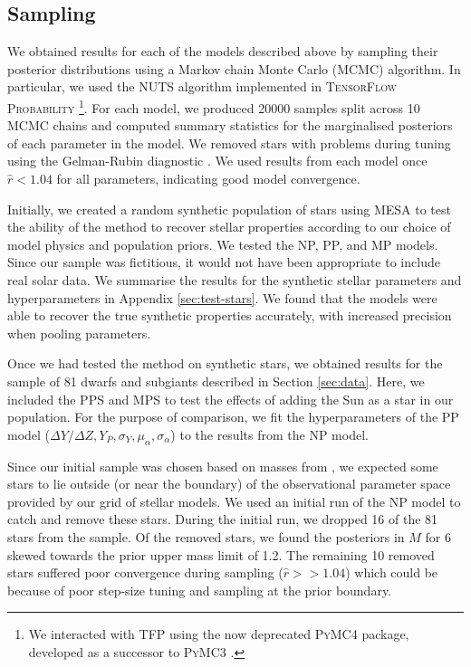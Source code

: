 \documentclass[fleqn,usenatbib]{mnras}
\begin{document}
\subsection{Sampling}\label{sec:sampling}

We obtained results for each of the models described above by sampling their posterior distributions using a Markov chain Monte Carlo (MCMC) algorithm. In particular, we used the NUTS algorithm implemented in \textsc{TensorFlow Probability} \citep[\textsc{TFP};][]{Abadi.Barham.ea2016, Dillon.Langmore.ea2017}\footnote{We interacted with \textsc{TFP} using the now deprecated \textsc{PyMC4} package, developed as a successor to \textsc{PyMC3} \citep{Salvatier.Wiecki.ea2016}.}. For each model, we produced \num{20000} samples split across \num{10} MCMC chains and computed summary statistics for the marginalised posteriors of each parameter in the model. We removed stars with problems during tuning using the Gelman-Rubin diagnostic \citep[$\hat{r}$;][]{Gelman.Rubin1992}. We used results from each model once $\hat{r} < 1.04$ for all parameters, indicating good model convergence.

Initially, we created a random synthetic population of stars using \textsc{MESA} to test the ability of the method to recover stellar properties according to our choice of model physics and population priors. We tested the NP, PP, and MP models. Since our sample was fictitious, it would not have been appropriate to include real solar data. We summarise the results for the synthetic stellar parameters and hyperparameters in Appendix \ref{sec:test-stars}. We found that the models were able to recover the true synthetic properties accurately, with increased precision when pooling parameters.

Once we had tested the method on synthetic stars, we obtained results for the sample of 81 dwarfs and subgiants described in Section \ref{sec:data}. Here, we included the PPS and MPS to test the effects of adding the Sun as a star in our population. For the purpose of comparison, we fit the hyperparameters of the PP model ($\Delta Y/\Delta Z, Y_P, \sigma_Y, \mu_\alpha, \sigma_\alpha$) to the results from the NP model.

Since our initial sample was chosen based on masses from , we expected some stars to lie outside (or near the boundary) of the observational parameter space provided by our grid of stellar models. We used an initial run of the NP model to catch and remove these stars. During the initial run, we dropped 16 of the 81 stars from the sample. Of the removed stars, we found the posteriors in $M$ for 6 skewed towards the prior upper mass limit of \SI{1.2}{\solarmass}. The remaining 10 removed stars suffered poor convergence during sampling ($\hat{r} >> 1.04$) which could be because of poor step-size tuning and sampling at the prior boundary.
\end{document}
